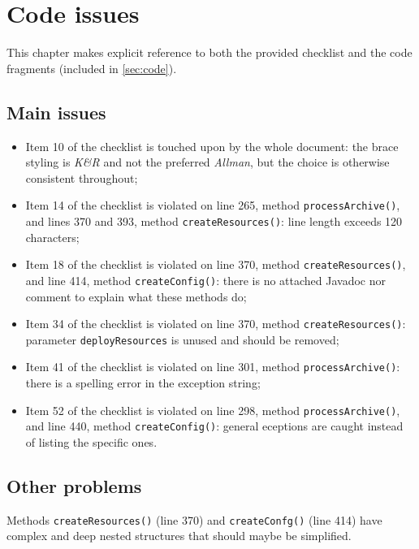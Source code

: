 \chapter{Code issues}
This chapter makes explicit reference to both the provided checklist and the code fragments (included in \autoref{sec:code}).

\section{Main issues}
\begin{itemize}
\item Item 10 of the checklist is touched upon by the whole document: the brace styling is \emph{K\&R} and not the preferred \emph{Allman}, but the choice is otherwise consistent throughout;
\item Item 14 of the checklist is violated on line 265, method \texttt{processArchive()}, and lines 370 and 393, method \texttt{createResources()}: line length exceeds 120 characters;
\item Item 18 of the checklist is violated on line 370, method \texttt{create\-Resources()}, and line 414, method \texttt{createConfig()}: there is no attached Javadoc nor comment to explain what these methods do;
\item Item 34 of the checklist is violated on line 370, method \texttt{createResources()}: parameter \texttt{deployResources} is unused and should be removed;
\item Item 41 of the checklist is violated on line 301, method \texttt{processArchive()}: there is a spelling error in the exception string;
\item Item 52 of the checklist is violated on line 298, method \texttt{processArchive()}, and line 440, method \texttt{createConfig()}: general eceptions are caught instead of listing the specific ones.
\end{itemize}

\section{Other problems}
Methods \texttt{createResources()} (line 370) and \texttt{createConfg()} (line 414) have complex and deep nested structures that should maybe be simplified.
